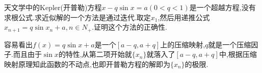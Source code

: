\documentclass[cn,chinese]{elegantbook}
\begin{document}
            \begin{exercise}
                天文学中的Kepler(开普勒)方程$x-q\sin x=a(0<q<1)$是一个超越方程,没有求根公式.求近似解的一个方法是通过迭代.取定$x_1$,然后用递推公式$x_{n+1}=q\sin x_n+a,n\in N_+$.证明这个方法的正确性.
            \end{exercise}
            \begin{solution}
                容易看出$f(x)=q\sin x+a$是一个$[a-q,a+q]$上的压缩映射,$q$就是一个压缩因子.而且由于$\sin x$的特性,从第二项开始就$\{x_n\}$就落入了$[a-q,a+q]$中,根据压缩映射原理知此函数的不动点,也即开普勒方程的解即为$\{x_n\}$的极限.
            \end{solution}
\end{document}
